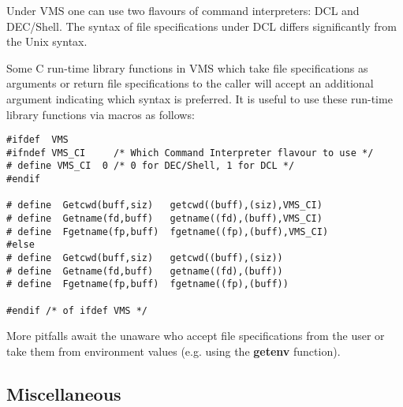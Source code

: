Under VMS one can use two flavours of command interpreters: DCL and
DEC/Shell. The syntax of file specifications under DCL differs significantly
from the Unix syntax.

Some C run-time library functions in VMS which take file specifications
as arguments or return file specifications to the caller will accept
an additional argument indicating which syntax is preferred. It is
useful to use these run-time library functions via macros as follows:

\begin{verbatim}
#ifdef  VMS
#ifndef VMS_CI     /* Which Command Interpreter flavour to use */
# define VMS_CI  0 /* 0 for DEC/Shell, 1 for DCL */
#endif

# define  Getcwd(buff,siz)   getcwd((buff),(siz),VMS_CI)
# define  Getname(fd,buff)   getname((fd),(buff),VMS_CI)
# define  Fgetname(fp,buff)  fgetname((fp),(buff),VMS_CI)
#else
# define  Getcwd(buff,siz)   getcwd((buff),(siz))
# define  Getname(fd,buff)   getname((fd),(buff))
# define  Fgetname(fp,buff)  fgetname((fp),(buff))

#endif /* of ifdef VMS */
\end{verbatim}

More pitfalls await the unaware who accept file specifications from the
user or take them from environment values (e.g. using the {\bf getenv}
function).

\subsection{Miscellaneous}


